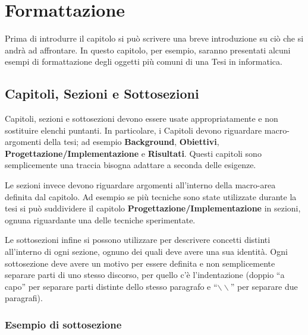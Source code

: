 \chapter{Formattazione}\label{chapter:formattazione}
Prima di introdurre il capitolo si può scrivere una breve introduzione su ciò che si andrà ad affrontare.
In questo capitolo, per esempio, saranno presentati alcuni esempi di formattazione degli oggetti più comuni di una Tesi in informatica.


\section{Capitoli, Sezioni e Sottosezioni}\label{sec:cap_sec_subsec}
Capitoli, sezioni e sottosezioni devono essere usate appropriatamente e non sostituire elenchi puntanti.
In particolare, i Capitoli devono riguardare macro-argomenti della tesi; ad esempio \textbf{Background}, \textbf{Obiettivi}, \textbf{Progettazione/Implementazione} e \textbf{Risultati}.
Questi capitoli sono semplicemente una traccia bisogna adattare a seconda delle esigenze.

Le sezioni invece devono riguardare argomenti all'interno della macro-area definita dal capitolo.
Ad esempio se più tecniche sono state utilizzate durante la tesi si può suddividere il capitolo \textbf{Progettazione/Implementazione} in sezioni, ognuna riguardante una delle tecniche sperimentate.

Le sottosezioni infine si possono utilizzare per descrivere concetti distinti all'interno di ogni sezione, ognuno dei quali deve avere una sua identità.
Ogni sottosezione deve avere un motivo per essere definita e non semplicemente separare parti di uno stesso discorso, per quello c'è l'indentazione (doppio ``a capo'' per separare parti distinte dello stesso paragrafo e ``$\backslash\backslash$'' per separare due paragrafi).

\subsection{Esempio di sottosezione}\label{subsec:es_subsec}
\blindtext

